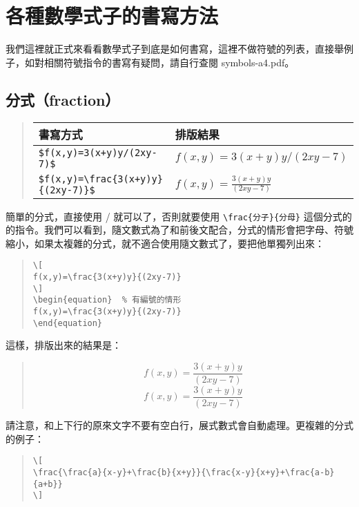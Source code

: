 \section{各種數學式子的書寫方法}

我們這裡就正式來看看數學式子到底是如何書寫，這裡不做符號的列表，直接舉例子，如對相關符號指令的書寫有疑問，請自行查閱 {\ttfamily symbols-a4.pdf}。

\subsection{分式（fraction）}

\begin{quote}
  \begin{tabular}{ll}
    書寫方式                & 排版結果                         \\
    \hline
    \verb|$f(x,y)=3(x+y)y/(2xy-7)$| & $f(x,y)=3(x+y)y/(2xy-7)$         \\
    \verb|$f(x,y)=\frac{3(x+y)y}{(2xy-7)}$| & $f(x,y)=\frac{3(x+y)y}{(2xy-7)}$ \\
  \end{tabular}
\end{quote}

簡單的分式，直接使用 {\ttfamily /} 就可以了，否則就要使用 \verb|\frac{分子}{分母}| 這個分式的的指令。我們可以看到，隨文數式為了和前後文配合，分式的情形會把字母、符號縮小，如果太複雜的分式，就不適合使用隨文數式了，要把他單獨列出來：

\begin{quote}
  \begin{verbatim}
\[
f(x,y)=\frac{3(x+y)y}{(2xy-7)}
\]
\begin{equation}  % 有編號的情形
f(x,y)=\frac{3(x+y)y}{(2xy-7)}
\end{equation}
\end{verbatim}
\end{quote}

這樣，排版出來的結果是：
\begin{quote}
  \[
    f(x,y)=\frac{3(x+y)y}{(2xy-7)}
  \]
  \begin{equation}
    f(x,y)=\frac{3(x+y)y}{(2xy-7)}
  \end{equation}
\end{quote}
請注意，和上下行的原來文字不要有空白行，展式數式會自動處理。更複雜的分式的例子：

\begin{quote}
  \begin{verbatim}
\[
\frac{\frac{a}{x-y}+\frac{b}{x+y}}{\frac{x-y}{x+y}+\frac{a-b}{a+b}}
\]
\end{verbatim}
\end{quote}

